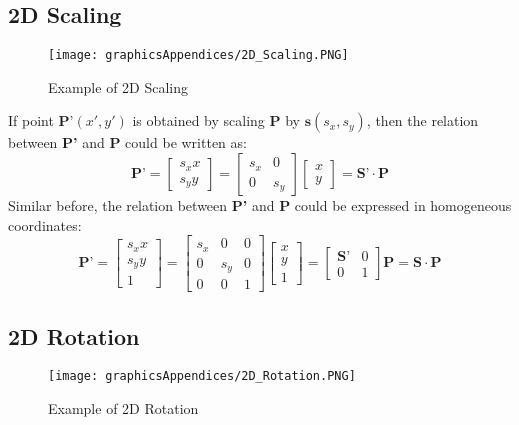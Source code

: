 \subsection{2D Scaling}
\begin{figure}[h!]
\centering
\texttt{[image: graphicsAppendices/2D\_Scaling.PNG]}
\caption{Example of 2D Scaling}
\label{fig:2DScaling}
\end{figure}
If point $\textbf{P'}(x', y')$ is obtained by scaling \textbf{P} by $\textbf{s}(s_x, s_y)$, then the relation between \textbf{P'} and \textbf{P} could be written as:\\
$$\textbf{P'} = \left[\begin{array}{c} s_x x \\ s_y y \end{array}\right] = \left[\begin{array}{ccc} s_x & 0\\ 
0 & s_y \end{array}\right]\left[\begin{array}{c} x \\ y \end{array}\right] = \textbf{S'} \cdot \textbf{P}$$  
Similar before, the relation between \textbf{P'} and \textbf{P} could be expressed in homogeneous coordinates:
$$\textbf{P'}=\left[\begin{array}{c} s_{x} x \\ s_{y} y \\ 1 \end{array}\right] = \left[\begin{array}{ccc} s_x & 0 & 0 \\ 0 & s_y & 0 \\ 0 & 0 & 1 \end{array}\right] \left[\begin{array}{c} x \\ y \\ 1 \end{array}\right] = \left[\begin{array}{rr} \textbf{S'} & 0 \\ 0 & 1 \end{array}\right] \textbf{P} = \textbf{S} \cdot \textbf{P}$$

\subsection{2D Rotation}
\begin{figure}[h!]
\centering
\texttt{[image: graphicsAppendices/2D\_Rotation.PNG]}
\caption{Example of 2D Rotation}
\label{fig:2DRotation}
\end{figure}

